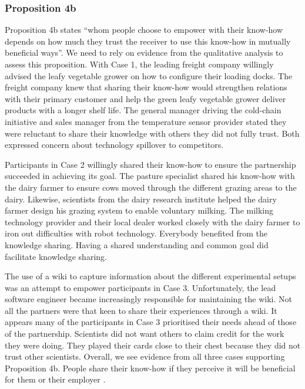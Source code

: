 \subsubsection{Proposition 4b}

Proposition 4b states \enquote{whom people choose to empower with their know-how depends on how much they trust the receiver to use this know-how in mutually beneficial ways}. We need to rely on evidence from the qualitative analysis to assess this proposition. With Case 1, the leading freight company willingly advised the leafy vegetable grower on how to configure their loading docks. The freight company knew that sharing their know-how would strengthen relations with their primary customer and help the green leafy vegetable grower deliver products with a longer shelf life. The general manager driving the cold-chain initiative and sales manager from the temperature sensor provider stated they were reluctant to share their knowledge with others they did not fully trust. Both expressed concern about technology spillover to competitors. \medskip

Participants in Case 2 willingly shared their know-how to ensure the partnership succeeded in achieving its goal. The pasture specialist shared his know-how with the dairy farmer to ensure cows moved through the different grazing areas to the dairy. Likewise, scientists from the dairy research institute helped the dairy farmer design his grazing system to enable voluntary milking. The milking technology provider and their local dealer worked closely with the dairy farmer to iron out difficulties with robot technology. Everybody benefited from the knowledge sharing. Having a shared understanding and common goal did facilitate knowledge sharing. \medskip

The use of a wiki to capture information about the different experimental setups was an attempt to empower participants in Case 3. Unfortunately, the lead software engineer became increasingly responsible for maintaining the wiki. Not all the partners were that keen to share their experiences through a wiki. It appears many of the participants in Case 3 prioritised their needs ahead of those of the partnership. Scientists did not want others to claim credit for the work they were doing. They played their cards close to their chest because they did not trust other scientists. Overall, we see evidence from all three cases supporting Proposition 4b. People share their know-how if they perceive it will be beneficial for them or their employer \citep{liu2021more}.

